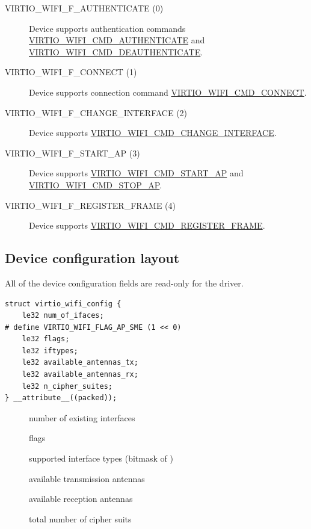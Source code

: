 \begin{description}
  \item[VIRTIO_WIFI_F_AUTHENTICATE (0)] Device supports authentication commands \hyperref[sec:Device Types / 802.11 Device / Device Operation / Common Definitions / Authentication Types]{VIRTIO_WIFI_CMD_AUTHENTICATE} and \hyperref[sec:Device Types / 802.11 Device / Device Operation / Common Definitions / Authentication Types]{VIRTIO_WIFI_CMD_DEAUTHENTICATE}.
\item[VIRTIO_WIFI_F_CONNECT (1)] Device supports connection command \hyperref[def:Device Types / 802.11 Device / Device Operation / Connection / VIRTIO_WIFI_CMD_CONNECT]{VIRTIO_WIFI_CMD_CONNECT}.
\item[VIRTIO_WIFI_F_CHANGE_INTERFACE (2)] Device supports \hyperref[sec:Device Types / 802.11 Device / Device Operation / Interface Management / Modifying Interfaces]{VIRTIO_WIFI_CMD_CHANGE_INTERFACE}.
\item[VIRTIO_WIFI_F_START_AP (3)] Device supports \hyperref[sec:Device Types / 802.11 Device / Device Operation / Access Point Management / Starting an Access Point]{VIRTIO_WIFI_CMD_START_AP} and \hyperref[sec:Device Types / 802.11 Device / Device Operation / Access Point Management / Starting an Access Point]{VIRTIO_WIFI_CMD_STOP_AP}.
\item[VIRTIO_WIFI_F_REGISTER_FRAME (4)] Device supports \hyperref[sec:Device Types / 802.11 Device / Device Operation / Registering Reception of Specific 802.11 Frames]{VIRTIO_WIFI_CMD_REGISTER_FRAME}.
\end{description}

\subsection{Device configuration layout}\label{sec:Device Types / 802.11 Device / Device configuration layout}

All of the device configuration fields are read-only for the driver.

\begin{lstlisting}
struct virtio_wifi_config {
	le32 num_of_ifaces;
# define VIRTIO_WIFI_FLAG_AP_SME (1 << 0)
	le32 flags;
	le32 iftypes;
	le32 available_antennas_tx;
	le32 available_antennas_rx;
	le32 n_cipher_suites;
} __attribute__((packed));
\end{lstlisting}

\begin{description}
\item[] number of existing interfaces
\item[] flags
\item[] supported interface types (bitmask of \hyperref[def:Device Types / 802.11 Device / Device Operation / Common Definitions / Interface Types / enum virtio_wifi_iftype]{})
\item[] available transmission antennas
\item[] available reception antennas
\item[] total number of cipher suits
\end{description}

